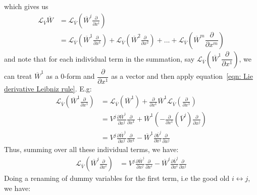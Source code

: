         which gives us
        \begin{align*}
          \mathcal{L}_{\overline{V}}\overline{W}
          &=
          \mathcal{L}_{\overline{V}}\left(\overline{W}^i\frac{\partial}{\partial
          x^i}\right) \\
          &=
          \mathcal{L}_{\overline{V}}\left(\overline{W}^1\frac{\partial}{\partial
          x^1}\right) +
          \mathcal{L}_{\overline{V}}\left(\overline{W}^2\frac{\partial}{\partial
          x^2}\right) + ... +
          \mathcal{L}_{\overline{V}}\left(\overline{W}^m\dfrac{\partial}{\partial
          x^m}\right)
        \end{align*}
        and note that for each individual term in the summation, say
        $\mathcal{L}_{\overline{V}}\left(\overline{W}^1\dfrac{\partial}{\partial
        x^1}\right)$, we can treat $\overline{W}^1$ as a 0-form and
        $\dfrac{\partial}{\partial x^1}$ as a vector and then apply
        equation~\ref{eqn: Lie derivative Leibniz rule}. E.g:
        \begin{align*}
          \mathcal{L}_{\overline{V}}\left(\overline{W}^1\frac{\partial}{\partial
          x^1}\right)
          &=
          \mathcal{L}_{\overline{V}}\left(\overline{W}^1\right) +
          \frac{\partial}{\partial
          x^1}
          \overline{W}^1\mathcal{L}_{\overline{V}}\left(\frac{\partial}{\partial
          x^1}\right) \\
          &= V^j \frac{\partial \overline{W}^1}{\partial
          x^j}\frac{\partial}{\partial x^1} + \overline{W}^1
          \left(-\frac{\partial}{\partial x^1}\left(\overline{V}^j\right)
          \frac{\partial}{\partial x^j}\right) \\
          &= V^j\frac{\partial \overline{W}^1}{\partial
          x^j}\frac{\partial}{\partial x^1} - \overline{W}^1 \frac{\partial
          \overline{V}^j}{\partial x^1}\frac{\partial}{\partial x^j}
        \end{align*}
        Thus, summing over all these individual terms, we have:
        \begin{align*}
          \mathcal{L}_{\overline{V}}\left(\overline{W}^i\frac{\partial}{\partial
          x^i}\right) &=
          V^j\frac{\partial \overline{W}^i}{\partial
          x^j}\frac{\partial}{\partial x^i} - \overline{W}^i \frac{\partial
          \overline{V}^j}{\partial x^i}\frac{\partial}{\partial x^j}
        \end{align*}
        Doing a renaming of dummy variables for the first term, i.e the good
        old $ i\leftrightarrow j$, we have:
